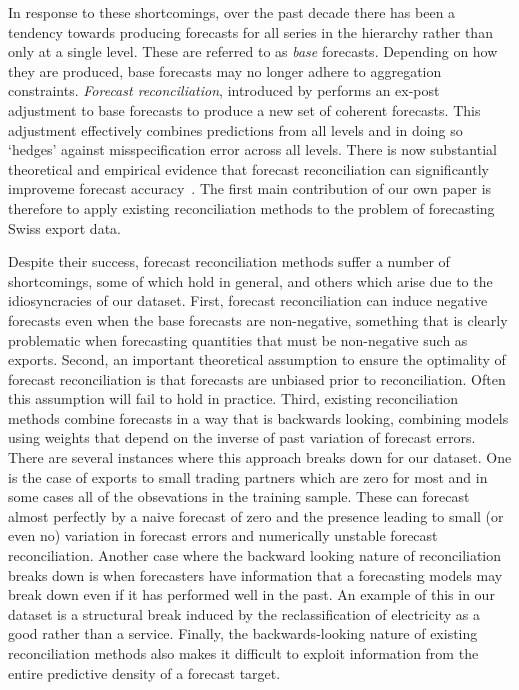 \documentclass[a4paper,fleqn,11pt]{article}
\begin{document}
In response to these shortcomings, over the past decade there has been a tendency towards producing forecasts for all series in the hierarchy rather than only at a single level.  These are referred to as {\em base} forecasts.  Depending on how they are produced, base forecasts may no longer adhere to aggregation constraints.  {\em Forecast reconciliation}, introduced by \cite{Hyndman2011} performs an ex-post adjustment to base forecasts to produce a new set of coherent forecasts. This adjustment effectively combines predictions from all levels and in doing so `hedges' against misspecification error across all levels.  There is now substantial theoretical and empirical evidence that forecast reconciliation can significantly improveme forecast accuracy~\citep[see][and references therein]{Wickramasuriya2015}. The first main contribution of our own paper is therefore to apply existing reconciliation methods to the problem of forecasting Swiss export data.

Despite their success, forecast reconciliation methods suffer a number of shortcomings, some of which hold in general, and others which arise due to the idiosyncracies of our dataset.  First, forecast reconciliation can induce negative forecasts even when the base forecasts are non-negative, something that is clearly problematic when forecasting quantities that must be non-negative such as exports.   Second, an important theoretical assumption to ensure the optimality of forecast reconciliation is that forecasts are unbiased prior to reconciliation.  Often this assumption will fail to hold in practice.  Third, existing reconciliation methods combine forecasts in a way that is backwards looking, combining models using weights that depend on the inverse of past variation of forecast errors.  There are several instances where this approach breaks down for our dataset.  One is the case of exports to small trading partners which are zero for most and in some cases all of the obsevations in the training sample.  These can forecast almost perfectly by a naive forecast of zero and the presence leading to small (or even no) variation in forecast errors and numerically unstable forecast reconciliation.  Another case where the backward looking nature of reconciliation breaks down is when forecasters have information that a forecasting models may break down even if it has performed well in the past. An example of this in our dataset is a structural break induced by the reclassification of electricity as a good rather than a service.  Finally, the backwards-looking nature of existing reconciliation methods also makes it difficult to exploit information from the entire predictive density of a forecast target.\\
\end{document}
